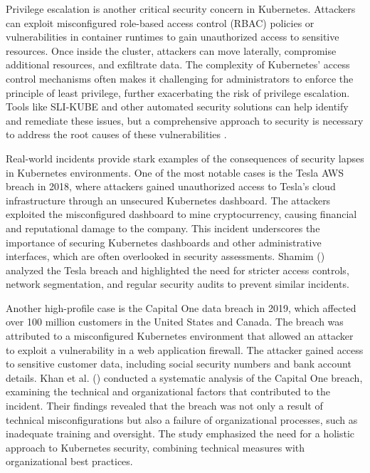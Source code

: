 Privilege escalation is another critical security concern in Kubernetes. Attackers can exploit misconfigured role-based access control (RBAC) policies or vulnerabilities in container runtimes to gain unauthorized access to sensitive resources. Once inside the cluster, attackers can move laterally, compromise additional resources, and exfiltrate data. The complexity of Kubernetes' access control mechanisms often makes it challenging for administrators to enforce the principle of least privilege, further exacerbating the risk of privilege escalation. Tools like SLI-KUBE and other automated security solutions can help identify and remediate these issues, but a comprehensive approach to security is necessary to address the root causes of these vulnerabilities \citep{rahman2023}.

Real-world incidents provide stark examples of the consequences of security lapses in Kubernetes environments. One of the most notable cases is the Tesla AWS breach in 2018, where attackers gained unauthorized access to Tesla's cloud infrastructure through an unsecured Kubernetes dashboard. The attackers exploited the misconfigured dashboard to mine cryptocurrency, causing financial and reputational damage to the company. This incident underscores the importance of securing Kubernetes dashboards and other administrative interfaces, which are often overlooked in security assessments. Shamim (\citeyear{shamim2021}) analyzed the Tesla breach and highlighted the need for stricter access controls, network segmentation, and regular security audits to prevent similar incidents.

Another high-profile case is the Capital One data breach in 2019, which affected over 100 million customers in the United States and Canada. The breach was attributed to a misconfigured Kubernetes environment that allowed an attacker to exploit a vulnerability in a web application firewall. The attacker gained access to sensitive customer data, including social security numbers and bank account details. Khan et al. (\citeyear{khan2023}) conducted a systematic analysis of the Capital One breach, examining the technical and organizational factors that contributed to the incident. Their findings revealed that the breach was not only a result of technical misconfigurations but also a failure of organizational processes, such as inadequate training and oversight. The study emphasized the need for a holistic approach to Kubernetes security, combining technical measures with organizational best practices.

